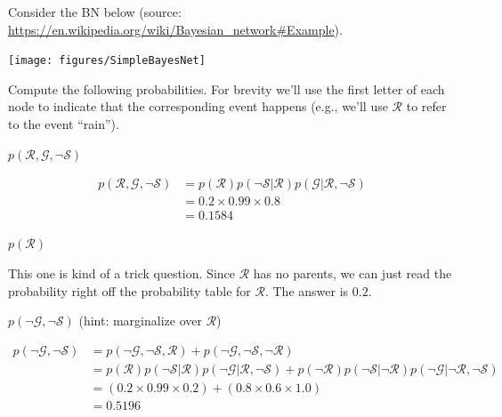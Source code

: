 \documentclass[assignment02_Solutions]{subfiles}
\begin{document}
\begin{exercise}[(20 minutes)]
Consider the BN below (source: \url{https://en.wikipedia.org/wiki/Bayesian_network\#Example}).

\begin{center}
\texttt{[image: figures/SimpleBayesNet]}
\end{center}

Compute the following probabilities.  For brevity we'll use the first letter of each node to indicate that the corresponding event happens (e.g., we'll use $\mathcal{R}$ to refer to the event ``rain'').
\bes
\item $p(\mathcal{R}, \mathcal{G}, \neg \mathcal{S})$
\begin{boxedsolution}
\begin{align}
p(\mathcal{R}, \mathcal{G}, \neg \mathcal{S}) &= p(\mathcal{R}) p(\neg \mathcal{S} | \mathcal{R}) p(\mathcal{G} | \mathcal{R}, \neg \mathcal{S}) \nonumber \\
&= 0.2 \times 0.99 \times 0.8 \nonumber \\
&= 0.1584 \nonumber
\end{align}
\end{boxedsolution}
\item $p(\mathcal{R})$
\begin{boxedsolution}
This one is kind of a trick question.  Since $\mathcal{R}$ has no parents, we can just read the probability right off the probability table for $\mathcal{R}$.  The answer is $0.2$.
\end{boxedsolution}
\item $p(\neg \mathcal{G}, \neg \mathcal{S})$ (hint: marginalize over $\mathcal{R}$)

\begin{boxedsolution}
\begin{align}
p(\neg \mathcal{G}, \neg \mathcal{S}) &= p(\neg \mathcal{G}, \neg \mathcal{S}, \mathcal{R}) + p(\neg \mathcal{G}, \neg \mathcal{S}, \neg \mathcal{R}) \nonumber \\
&= p(\mathcal{R}) p(\neg \mathcal{S} | \mathcal{R}) p (\neg \mathcal{G} | \mathcal{R}, \neg \mathcal{S} ) + p(\neg \mathcal{R}) p(\neg \mathcal{S} | \neg \mathcal{R}) p (\neg \mathcal{G} | \neg \mathcal{R}, \neg \mathcal{S} ) \nonumber \\
&= \left ( 0.2 \times 0.99 \times 0.2 \right ) + \left ( 0.8 \times 0.6 \times 1.0 \right ) \nonumber \\
&= 0.5196 \nonumber
\end{align}
\end{boxedsolution}

\ees

\end{exercise}
\end{document}
